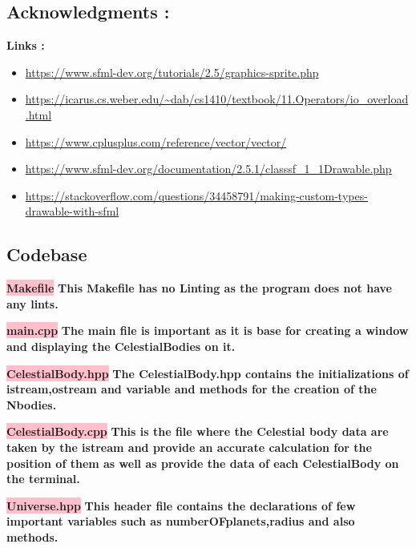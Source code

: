 \subsection{Acknowledgments :}\label{sec:ps3a:ack}
\textbf{Links :}
\begin{itemize}
    \item \url{https://www.sfml-dev.org/tutorials/2.5/graphics-sprite.php}
    \item \url{https://icarus.cs.weber.edu/~dab/cs1410/textbook/11.Operators/io_overload.html}
    \item \url{https://www.cplusplus.com/reference/vector/vector/}
    \item \url{https://www.sfml-dev.org/documentation/2.5.1/classsf_1_1Drawable.php}
    \item \url{https://stackoverflow.com/questions/34458791/making-custom-types-drawable-with-sfml}
\end{itemize}
\newpage


\subsection{Codebase}\label{sec:ps3a:code}

\textbf{\colorbox{pink}{Makefile}} \newline \textbf{This Makefile has no Linting as the program does not have any lints.}


\textbf{\colorbox{pink}{main.cpp}} \newline \textbf{The main file is important as it is base for creating a window and displaying the CelestialBodies on it.}


\textbf{\colorbox{pink}{CelestialBody.hpp}} \newline \textbf{The CelestialBody.hpp contains the initializations of istream,ostream and variable and methods for the creation of the Nbodies.}


\newpage
\textbf{\colorbox{pink}{CelestialBody.cpp}} \newline \textbf{This is the file where the Celestial body data are taken by the istream and provide an accurate calculation for the position of them as well as provide the data of each CelestialBody on the terminal.}


\textbf{\colorbox{pink}{Universe.hpp}} \newline \textbf{This header file contains the declarations of few important variables such as numberOFplanets,radius and also methods.}



